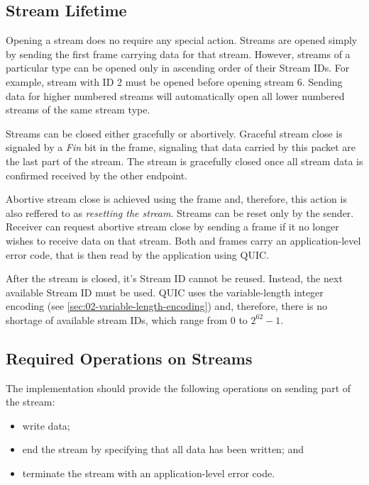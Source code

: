 \subsection{Stream Lifetime}

Opening a stream does no require any special action. Streams are opened simply by sending the first
\STREAM{} frame carrying data for that stream. However, streams of a particular type can be opened
only in ascending order of their Stream IDs. For example, stream with ID 2 must be opened before
opening stream 6. Sending data for higher numbered streams will automatically open all lower
numbered streams of the same stream type.

Streams can be closed either gracefully or abortively. Graceful stream close is signaled by a
\textit{Fin} bit in the \STREAM{} frame, signaling that data carried by this packet are the last
part of the stream. The stream is gracefully closed once all stream data is confirmed received by
the other endpoint.

Abortive stream close is achieved using the \RESETSTREAM{} frame and, therefore, this action is also
reffered to as \textit{resetting the stream}. Streams can be reset only by the sender. Receiver can
request abortive stream close by sending a \STOPSENDING{} frame if it no longer wishes to receive
data on that stream. Both \RESETSTREAM{} and \STOPSENDING{} frames carry an application-level error
code, that is then read by the application using QUIC.

After the stream is closed, it's Stream ID cannot be reused. Instead, the next available Stream ID
must be used. QUIC uses the variable-length integer encoding (see
\autoref{sec:02-variable-length-encoding}) and, therefore, there is no shortage of available stream
IDs, which range from 0 to $2^{62}-1$.

\subsection{Required Operations on Streams}

The implementation should provide the following operations on sending part of the stream:

\begin{itemize}

  \item write data;

  \item end the stream by specifying that all data has been written; and

  \item terminate the stream with an application-level error code.

\end{itemize}

